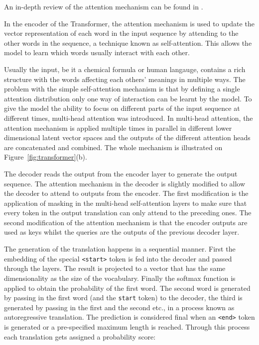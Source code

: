 An in-depth review of the attention mechanism can be found in \cite{Niu2021AttnReview}.

In the encoder of the Transformer, the attention mechanism is used to update the vector representation of each word in the input sequence by attending to the other words in the sequence, a technique known as self-attention. This allows the model to learn which words usually interact with each other.

Usually the input, be it a chemical formula or human langauge, contains a rich structure with the words affecting each others' meanings in multiple ways. The problem with the simple self-attention mechanism is that by defining a single attention distribution only one way of interaction can be learnt by the model. To give the model the ability to focus on different parts of the input sequence at different times, multi-head attention was introduced. In multi-head attention, the attention mechanism is applied multiple times in parallel in different lower dimensional latent vector spaces and the outputs of the different attention heads are concatenated and combined. The whole mechanism is illustrated on Figure~\ref{fig:transformer}(b).

The decoder reads the output from the encoder layer to generate the output sequence. The attention mechanism in the decoder is slightly modified to allow the decoder to attend to outputs from the encoder. The first modification is the application of masking in the multi-head self-attention layers to make sure that every token in the output translation can only attend to the preceding ones. The second modification of the attention mechanism is that the encoder outputs are used as keys whilst the queries are the outputs of the previous decoder layer. 

The generation of the translation happens in a sequential manner. First the embedding of the special \texttt{<start>} token is fed into the decoder and passed through the layers. The result is projected to a vector that has the same dimensionality as the size of the vocabulary. Finally the softmax function is applied to obtain the probability of the first word. The second word is generated by passing in the first word (and the \texttt{start} token) to the decoder, the third is generated by passing in the first and the second etc., in a process known as autoregressive translation. The prediction is considered final when an \texttt{<end>} token is generated or a pre-specified maximum length is reached. Through this process each translation gets assigned a probability score:

